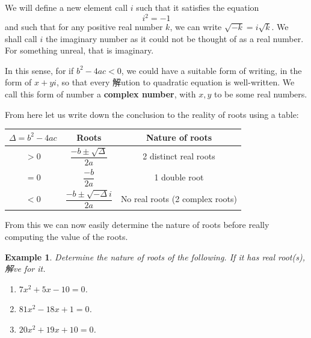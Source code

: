 \documentclass[12pt]{article}
\newtheorem{example}{Example}
\begin{document}
    We will define a new element call $i$ such that it satisfies the equation $$i^2=-1$$ and such that for any positive real number $k$, we can write $\sqrt{-k}=i\sqrt{k}$. We shall call $i$ the imaginary number as it could not be thought of as a real number. For something unreal, that is imaginary.

    In this sense, for if $b^2-4ac<0$, we could have a suitable form of writing, in the form of $x+yi$, so that every 解ution to quadratic equation is well-written. We call this form of number a \textbf{complex number}, with $x,y$ to be some real numbers.

    From here let us write down the conclusion to the reality of roots using a table:

    \begin{center}
        \begin{tabular}{|c|c|c|}
            \hline
            $\Delta=b^2-4ac$&Roots&Nature of roots\\
            \hline
            $>0$&$\dfrac{-b\pm\sqrt{\Delta}}{2a}$&2 distinct real roots\\
            \hline
            $=0$&$\dfrac{-b}{2a}$&1 double root\\
            \hline
            $<0$&$\dfrac{-b\pm\sqrt{-\Delta}i}{2a}$&No real roots (2 complex roots)\\
            \hline
        \end{tabular}
    \end{center}

    From this we can now easily determine the nature of roots before really computing the value of the roots.

    \begin{example}
        Determine the nature of roots of the following. If it has real root(s), 解ve for it.\begin{enumerate}
            \item[(a)] $7x^2+5x-10=0$.
            \item[(b)] $81x^2-18x+1=0$.
            \item[(c)] $20x^2+19x+10=0$.
        \end{enumerate}
    \end{example}
\end{document}

